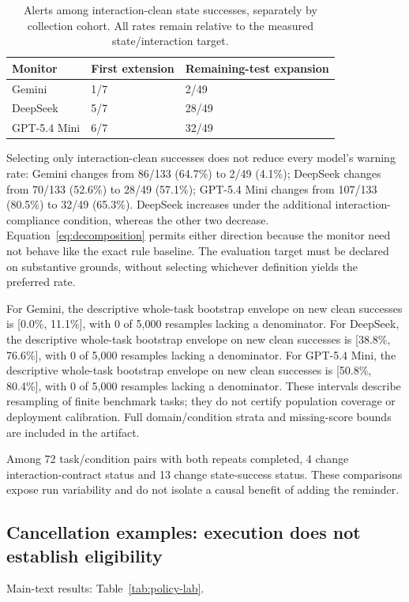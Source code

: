 \begin{table}[t]\centering\small
\caption{Alerts among interaction-clean state successes, separately by collection cohort.  All rates remain relative to the measured state/interaction target.}\label{tab:expanded-monitors}
\begin{tabular}{lll}
\toprule
Monitor & First extension & Remaining-test expansion\\
\midrule
Gemini & 1/7 & 2/49\\
DeepSeek & 5/7 & 28/49\\
GPT-5.4 Mini & 6/7 & 32/49\\
\bottomrule
\end{tabular}
\end{table}
Selecting only interaction-clean successes does not reduce every model's warning rate: Gemini changes from 86/133 (64.7\%) to 2/49 (4.1\%); DeepSeek changes from 70/133 (52.6\%) to 28/49 (57.1\%); GPT-5.4 Mini changes from 107/133 (80.5\%) to 32/49 (65.3\%). DeepSeek increases under the additional interaction-compliance condition, whereas the other two decrease. Equation~\ref{eq:decomposition} permits either direction because the monitor need not behave like the exact rule baseline. The evaluation target must be declared on substantive grounds, without selecting whichever definition yields the preferred rate.

For Gemini, the descriptive whole-task bootstrap envelope on new clean successes is [0.0\%, 11.1\%], with 0 of 5,000 resamples lacking a denominator. For DeepSeek, the descriptive whole-task bootstrap envelope on new clean successes is [38.8\%, 76.6\%], with 0 of 5,000 resamples lacking a denominator. For GPT-5.4 Mini, the descriptive whole-task bootstrap envelope on new clean successes is [50.8\%, 80.4\%], with 0 of 5,000 resamples lacking a denominator. These intervals describe resampling of finite benchmark tasks; they do not certify population coverage or deployment calibration. Full domain/condition strata and missing-score bounds are included in the artifact.


Among 72 task/condition pairs with both repeats completed, 4 change interaction-contract status and 13 change state-success status. These comparisons expose run variability and do not isolate a causal benefit of adding the reminder.


\subsection{Cancellation examples: execution does not establish eligibility}
Main-text results: Table~\ref{tab:policy-lab}.

